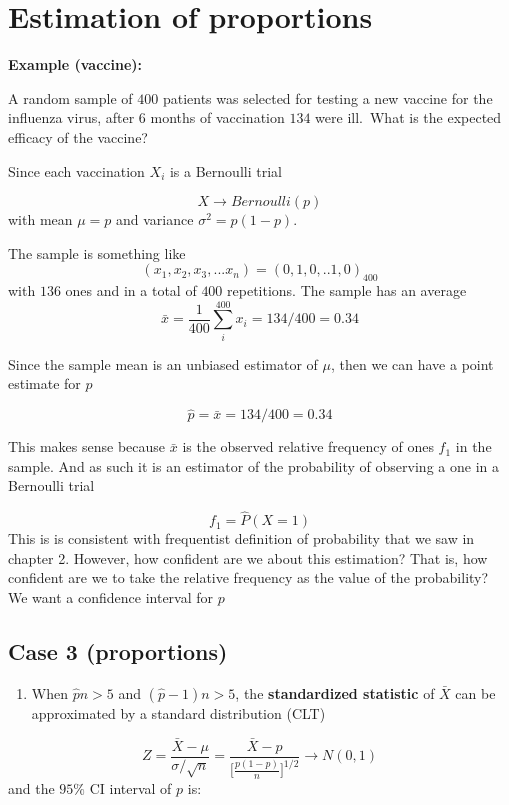 \documentclass[
]{book}
\providecommand{\tightlist}{%
  \setlength{\itemsep}{0pt}\setlength{\parskip}{0pt}}
\begin{document}
\hypertarget{estimation-of-proportions}{%
\section{Estimation of proportions}\label{estimation-of-proportions}}

\textbf{Example (vaccine):}

A random sample of \(400\) patients was selected for testing a new vaccine for the influenza virus, after \(6\) months of vaccination \(134\) were ill.~What is the expected efficacy of the vaccine?

Since each vaccination \(X_i\) is a Bernoulli trial

\[X \rightarrow Bernoulli(p)\]
with mean \(\mu=p\) and variance \(\sigma^2=p(1-p)\).

The sample is something like
\[(x_1,x_2, x_3, ...x_n)=(0,1,0,.. 1, 0)_{400}\] with \(136\) ones and in a total of \(400\) repetitions. The sample has an average \[\bar{x}=\frac{1}{400}\sum_i^{400} x_i=134/400=0.34\]

Since the sample mean is an unbiased estimator of \(\mu\), then we can have a point estimate for \(p\)

\[\hat{p}=\bar{x}=134/400=0.34\]

This makes sense because \(\bar{x}\) is the observed relative frequency of ones \(f_1\) in the sample. And as such it is an estimator of the probability of observing a one in a Bernoulli trial

\[f_1 =\hat{P}(X=1)\]
This is is consistent with frequentist definition of probability that we saw in chapter 2. However, how confident are we about this estimation? That is, how confident are we to take the relative frequency as the value of the probability? We want a confidence interval for \(p\)

\hypertarget{case-3-proportions}{%
\subsection{Case 3 (proportions)}\label{case-3-proportions}}

\begin{enumerate}
\def\labelenumi{\arabic{enumi}.}
\tightlist
\item
  When \(\hat{p}n>5\) and \((\hat{p}-1)n>5\), the \textbf{standardized statistic} of \(\bar{X}\) can be approximated by a standard distribution (CLT)
\end{enumerate}

\[Z=\frac{\bar{X}-\mu}{\sigma/\sqrt{n}}= \frac{\bar{X}-p}{\big[\frac{p(1-p)}{n} \big]^{1/2}}\rightarrow N(0,1)\]
and the \(95\%\) CI interval of \(p\) is:
\end{document}
